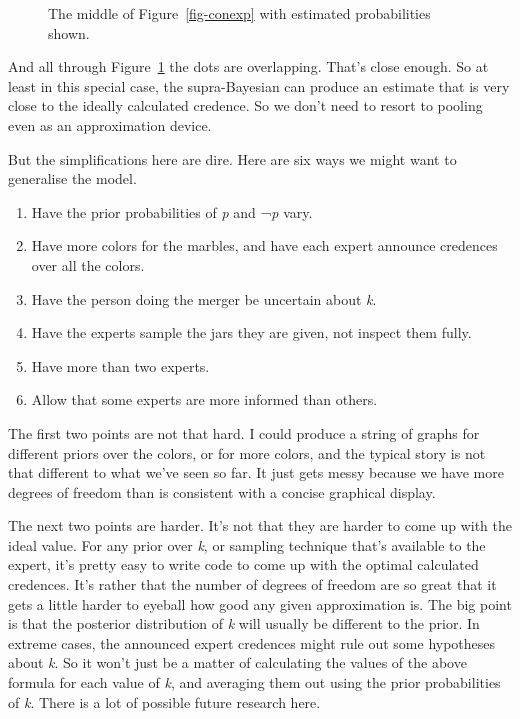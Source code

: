 \documentclass[
  10pt,
  letterpaper,
  DIV=11,
  numbers=noendperiod,
  twoside]{scrartcl}
\providecommand{\tightlist}{%
  \setlength{\itemsep}{0pt}\setlength{\parskip}{0pt}}\usepackage{longtable,booktabs,array}
\begin{document}
\begin{figure}


\caption{\label{fig-twoprob-middle}The middle of Figure~\ref{fig-conexp}
with estimated probabilities shown.}

\end{figure}%

And all through Figure~\ref{fig-twoprob-middle} the dots are
overlapping. That's close enough. So at least in this special case, the
supra-Bayesian can produce an estimate that is very close to the ideally
calculated credence. So we don't need to resort to pooling even as an
approximation device.

But the simplifications here are dire. Here are six ways we might want
to generalise the model.

\begin{enumerate}
\def\labelenumi{\arabic{enumi}.}
\tightlist
\item
  Have the prior probabilities of \emph{p} and ¬\emph{p} vary.
\item
  Have more colors for the marbles, and have each expert announce
  credences over all the colors.
\item
  Have the person doing the merger be uncertain about \emph{k}.
\item
  Have the experts sample the jars they are given, not inspect them
  fully.
\item
  Have more than two experts.
\item
  Allow that some experts are more informed than others.
\end{enumerate}

The first two points are not that hard. I could produce a string of
graphs for different priors over the colors, or for more colors, and the
typical story is not that different to what we've seen so far. It just
gets messy because we have more degrees of freedom than is consistent
with a concise graphical display.

The next two points are harder. It's not that they are harder to come up
with the ideal value. For any prior over \emph{k}, or sampling technique
that's available to the expert, it's pretty easy to write code to come
up with the optimal calculated credences. It's rather that the number of
degrees of freedom are so great that it gets a little harder to eyeball
how good any given approximation is. The big point is that the posterior
distribution of \emph{k} will usually be different to the prior. In
extreme cases, the announced expert credences might rule out some
hypotheses about \emph{k}. So it won't just be a matter of calculating
the values of the above formula for each value of \emph{k}, and
averaging them out using the prior probabilities of \emph{k}. There is a
lot of possible future research here.
\end{document}
